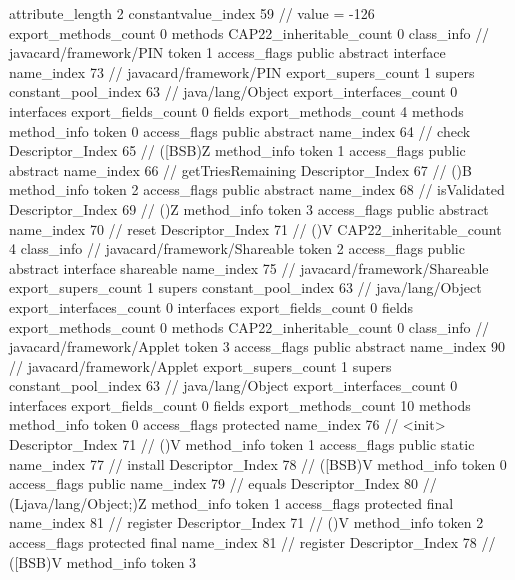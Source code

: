 {{{{{{{					attribute_length	2
					constantvalue_index	59		// value = -126
				}
				}
			}
			}
			export_methods_count	0
			methods {
			}
			CAP22_inheritable_count	0
		}
		class_info {		// javacard/framework/PIN
			token	1
			access_flags	public abstract interface
			name_index	73		// javacard/framework/PIN
			export_supers_count	1
			supers {
				constant_pool_index	63		// java/lang/Object
			}
			export_interfaces_count	0
			interfaces {
			}
			export_fields_count	0
			fields {
			}
			export_methods_count	4
			methods {
				method_info {
					token	0
					access_flags	public abstract
					name_index	64		// check
					Descriptor_Index	65		// ([BSB)Z
				}
				method_info {
					token	1
					access_flags	public abstract
					name_index	66		// getTriesRemaining
					Descriptor_Index	67		// ()B
				}
				method_info {
					token	2
					access_flags	public abstract
					name_index	68		// isValidated
					Descriptor_Index	69		// ()Z
				}
				method_info {
					token	3
					access_flags	public abstract
					name_index	70		// reset
					Descriptor_Index	71		// ()V
				}
			}
			CAP22_inheritable_count	4
		}
		class_info {		// javacard/framework/Shareable
			token	2
			access_flags	public abstract interface shareable
			name_index	75		// javacard/framework/Shareable
			export_supers_count	1
			supers {
				constant_pool_index	63		// java/lang/Object
			}
			export_interfaces_count	0
			interfaces {
			}
			export_fields_count	0
			fields {
			}
			export_methods_count	0
			methods {
			}
			CAP22_inheritable_count	0
		}
		class_info {		// javacard/framework/Applet
			token	3
			access_flags	public abstract
			name_index	90		// javacard/framework/Applet
			export_supers_count	1
			supers {
				constant_pool_index	63		// java/lang/Object
			}
			export_interfaces_count	0
			interfaces {
			}
			export_fields_count	0
			fields {
			}
			export_methods_count	10
			methods {
				method_info {
					token	0
					access_flags	protected
					name_index	76		// <init>
					Descriptor_Index	71		// ()V
				}
				method_info {
					token	1
					access_flags	public static
					name_index	77		// install
					Descriptor_Index	78		// ([BSB)V
				}
				method_info {
					token	0
					access_flags	public
					name_index	79		// equals
					Descriptor_Index	80		// (Ljava/lang/Object;)Z
				}
				method_info {
					token	1
					access_flags	protected final
					name_index	81		// register
					Descriptor_Index	71		// ()V
				}
				method_info {
					token	2
					access_flags	protected final
					name_index	81		// register
					Descriptor_Index	78		// ([BSB)V
				}
				method_info {
					token	3
}}}}}
